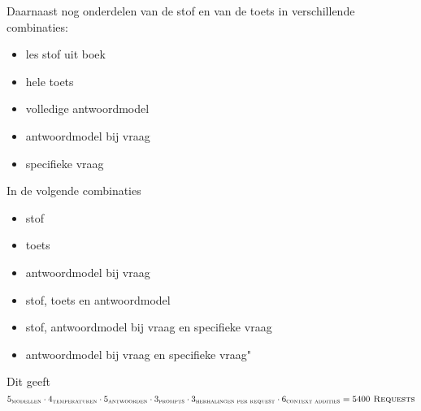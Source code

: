 \documentclass[12pt]{article}
\begin{document}
\begin{multicols}{2}
    
\noindent\begin{minipage}{\linewidth}
\noindent Daarnaast nog onderdelen van de stof en van de toets in verschillende combinaties:
\begin{itemize}
    \item les stof uit boek
    \item hele toets
    \item volledige antwoordmodel
    \item antwoordmodel bij vraag
    \item specifieke vraag
\end{itemize}
\end{minipage}%
\noindent\begin{minipage}{\linewidth}
In de volgende combinaties
\begin{itemize}
    \item stof
    \item toets
    \item antwoordmodel bij vraag
    \item stof, toets en antwoordmodel
    \item stof, antwoordmodel bij vraag en specifieke vraag
    \item antwoordmodel bij vraag en specifieke vraag"
\end{itemize}
\end{minipage}
\end{multicols}


\vspace{3em}
Dit geeft \large$5_{\textsc{modellen}} \cdot 4_{\textsc{temperaturen}}  \cdot 5_{\textsc{antwoorden}} \cdot 3_{\textsc{prompts}}  \cdot 3_{\textsc{herhalingen per request}}  \cdot 6_{\textsc{context addities}}= 5400 \textsc{ Requests}$ \normalsize
\end{document}
